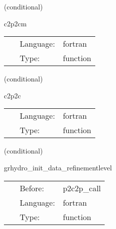 \documentclass{article}
\begin{document}
\vspace{5mm}

   (conditional) 

\hspace{5mm} c2p2cm 

\hspace{5mm}{\it testing conservative to primitive to conservative - mhd version } 


\hspace{5mm}

 \begin{tabular*}{160mm}{cll} 
~ & Language:  & fortran \\ 
~ & Type:  & function \\ 
\end{tabular*} 


\vspace{5mm}

   (conditional) 

\hspace{5mm} c2p2c 

\hspace{5mm}{\it testing conservative to primitive to conservative } 


\hspace{5mm}

 \begin{tabular*}{160mm}{cll} 
~ & Language:  & fortran \\ 
~ & Type:  & function \\ 
\end{tabular*} 


\vspace{5mm}

   (conditional) 

\hspace{5mm} grhydro\_init\_data\_refinementlevel 

\hspace{5mm}{\it calculate current refinement level } 


\hspace{5mm}

 \begin{tabular*}{160mm}{cll} 
~ & Before:  & p2c2p\_call \\ 
~ & Language:  & fortran \\ 
~ & Type:  & function \\ 
\end{tabular*} 
\end{document}
